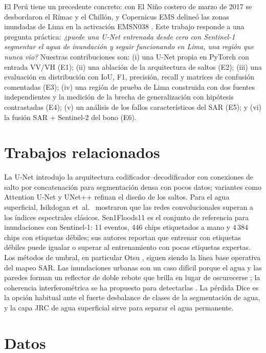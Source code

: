 \documentclass{article}
\begin{document}
El Perú tiene un precedente concreto: con El Niño costero de marzo de 2017 se desbordaron el Rímac y el Chillón, y Copernicus EMS delineó las zonas inundadas de Lima en la activación EMSN038 \cite{emsn038}. Este trabajo responde a una pregunta práctica: \emph{¿puede una U-Net entrenada desde cero con Sentinel-1 segmentar el agua de inundación y seguir funcionando en Lima, una región que nunca vio?} Nuestras contribuciones son: (i) una U-Net propia en PyTorch con entrada VV/VH (E1); (ii) una ablación de la arquitectura de saltos (E2); (iii) una evaluación en distribución con IoU, F1, precisión, recall y matrices de confusión comentadas (E3); (iv) una región de prueba de Lima construida con dos fuentes independientes y la medición de la brecha de generalización con hipótesis contrastadas (E4); (v) un análisis de los fallos característicos del SAR (E5); y (vi) la fusión SAR + Sentinel-2 del bono (E6).

\section{Trabajos relacionados}
La U-Net \cite{ronneberger2015} introdujo la arquitectura codificador--decodificador con conexiones de salto por concatenación para segmentación densa con pocos datos; variantes como Attention U-Net \cite{oktay2018} y UNet++ \cite{zhou2018} refinan el diseño de los saltos. Para el agua superficial, Isikdogan et~al.~\cite{isikdogan2017} mostraron que las redes convolucionales superan a los índices espectrales clásicos. Sen1Floods11 \cite{bonafilia2020} es el conjunto de referencia para inundaciones con Sentinel-1: 11 eventos, 446 chips etiquetados a mano y 4\,384 chips con etiquetas débiles; sus autores reportan que entrenar con etiquetas débiles puede igualar o superar al entrenamiento con pocas etiquetas expertas. Los métodos de umbral, en particular Otsu \cite{otsu1979}, siguen siendo la línea base operativa del mapeo SAR. Las inundaciones urbanas son un caso difícil porque el agua y las paredes forman un reflector de doble rebote que brilla en lugar de oscurecerse \cite{mason2014}; la coherencia interferométrica se ha propuesto para detectarlas \cite{chini2019}. La pérdida Dice \cite{milletari2016} es la opción habitual ante el fuerte desbalance de clases de la segmentación de agua, y la capa JRC de agua superficial \cite{pekel2016} sirve para separar el agua permanente.

\section{Datos}
\end{document}
